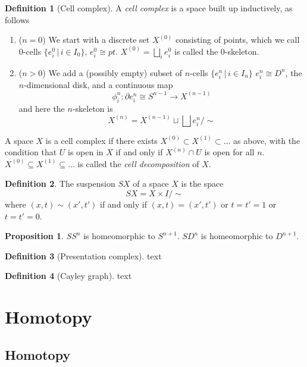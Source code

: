 \documentclass[a4paper,14pt]{extarticle}
\theoremstyle{definition}
\newtheorem*{definition}{Definition}
\newtheorem*{proposition}{Proposition}
\begin{document}
\begin{definition}[Cell complex]
  A \emph{cell complex} is a space built up inductively, as follows
  \begin{enumerate}
    \item ($n=0$) We start with a discrete set $X^{(0)}$ consisting of points, which we call 
    $0$-cells $\{e_i^0\,|\,i\in I_0\}, \,e_i^0\cong pt$. $X^{(0)}=\bigsqcup_i e_i^0$ is called the $0$-skeleton.
    \item ($n>0$) We add a (possibly empty) subset of $n$-cells $\{e_i^n\,|\,i\in I_n\}$ 
    $e_i^n\cong D^n$, the $n$-dimensional disk, and a continuous map 
    \[\phi_i^n:\partial e_i^n\cong S^{n-1}\rightarrow X^{(n-1)}\] and here the $n$-skeleton 
    is \[X^{(n)}=X^{(n-1)}\sqcup\bigsqcup e_i^n/\sim\]
  \end{enumerate}
  A space $X$ is a cell complex if there exists $X^{(0)}\subset X^{(1)}\subset\ldots$ 
  as above, with the condition that $U$ is open in $X$ if and only if 
  $X^{(n)}\cap U$ is open for all $n$. \\

  $X^{(0)}\subseteq X^{(1)}\subseteq\ldots$ is called the \emph{cell decomposition} of $X$.
\end{definition}

\begin{definition}
  The suspension $SX$ of a space $X$ is the space
  \[SX=X\times I/\sim\] where $(x,t)\sim (x',t')$ if and only if $(x,t)=(x',t')$ or 
  $t=t'=1$ or $t=t'=0$.
\end{definition}

\begin{proposition}
  $SS^n$ is homeomorphic to $S^{n+1}$. $SD^n$ is homeomorphic to $D^{n+1}$.
\end{proposition}

\begin{definition}[Presentation complex]
  text
\end{definition}

\begin{definition}[Cayley graph]
  text
\end{definition}

\section{Homotopy}

\subsection{Homotopy}
\end{document}
